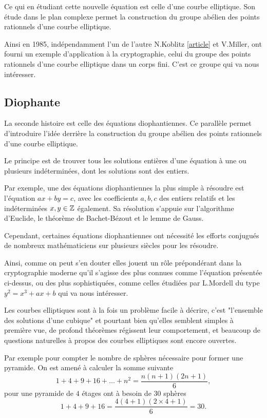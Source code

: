 Ce qui en étudiant cette nouvelle équation est celle d'une courbe elliptique. Son étude dans
le plan complexe permet la construction du groupe abélien des points rationnels d'une
courbe elliptique.

Ainsi en 1985, indépendamment l'un de l'autre N.Koblitz \ref{article} et V.Miller, ont fourni un exemple
d'application à la cryptographie, celui du groupe des points rationnels d'une courbe elliptique dans un corps fini. C'est ce
groupe qui va nous intéresser.

\subsection{Diophante}

La seconde histoire est celle des équations diophantiennes. Ce parallèle permet d'introduire
l'idée derrière la construction du groupe abélien des points rationnels d'une courbe
elliptique.

Le principe est de trouver tous les solutions entières d'une équation à une ou
plusieurs indéterminées, dont les solutions sont des entiers.

Par exemple, une des équations diophantiennes la plus simple à résoudre est l'équation $ax+by =
c$, avec
les coefficients $a,b,c$ des entiers relatifs et les indéterminées $x,y \in \mathbb{Z}$ également. Sa résolution s'appuie
sur l'algorithme d'Euclide, le théorème de Bachet-Bézout et le lemme de Gauss.

Cependant, certaines équations diophantiennes ont nécessité les efforts conjugués de nombreux
mathématiciens sur plusieurs siècles pour les résoudre.

Ainsi, comme on peut s'en douter elles jouent un rôle prépondérant dans la
cryptographie moderne qu'il s'agisse des plus connues comme l'équation présentée ci-dessus, ou
des plus sophistiquées, comme celles étudiées par L.Mordell du type $y^2 = x^3 + ax+b$ qui va
nous intéresser.

Les courbes elliptiques sont à la fois un problème facile à décrire, c'est "l'ensemble des
solutions d'une cubique" et pourtant bien qu'elles semblent simples à première vue, de profond
théorèmes régissent
leur comportement, et beaucoup de questions naturelles à propos des courbes elliptiques sont encore
ouvertes.

Par exemple pour compter le nombre de sphères nécessaire pour former une
pyramide. On est amené à calculer la somme suivante
\[
1 + 4 + 9 + 16 + \ldots + n^2 = \frac{n\left( n+1 \right) \left( 2n+1 \right) }{6}
,\] 
pour une pyramide de $4$ étages ont à besoin de 30 sphères 
\[
1 + 4 + 9 + 16 = \frac{4\left( 4 + 1 \right) \left( 2 \times 4 + 1 \right) }{6} = 30
.\] 

